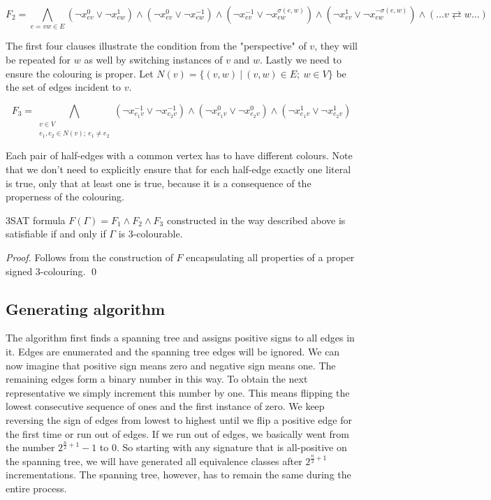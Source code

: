 $$F_2 = \bigwedge _{e = vw \in E} (\neg x^{0}_{ev} \vee \neg x^{1}_{ew}) \wedge (\neg x^{0}_{ev} \vee \neg x^{-1}_{ew}) \wedge (\neg x^{-1}_{ev} \lor \neg x^{\sigma (e, w)}_{ew}) \land (\neg x^{1}_{ev} \lor \neg x^{-\sigma (e, w)}_{ew}) \wedge (\dots v \rightleftarrows w \dots) $$

The first four clauses illustrate the condition from the "perspective" of $v$, they will be repeated for $w$ as well by switching instances of $v$ and $w$. Lastly we need to ensure the colouring is proper. Let $N(v) = \{(v, w) ~|~ (v,w) \in E; ~ w \in V \}$ be the set of edges incident to $v$.

$$F_3 = \bigwedge _{\substack{v \in V \\ e_1, e_2 \in N(v); ~ e_1 \neq e_2}} (\neg x^{-1}_{e_1v} \lor \neg x^{-1}_{e_2v}) \land (\neg x^{0}_{e_1v} \lor \neg x^{0}_{e_2v}) \land (\neg x^{1}_{e_1v} \lor \neg x^{1}_{e_2v}) $$

Each pair of half-edges with a common vertex has to have different colours. Note that we don't need to explicitly ensure that for each half-edge exactly one literal is true, only that at least one is true, because it is a consequence of the properness of the colouring.

\begin{theorem}
    3SAT formula $F(\Gamma) = F_1 \wedge F_2 \wedge F_3$ constructed in the way described above is satisfiable if and only if $\Gamma$ is 3-colourable.
\end{theorem}

\textit{Proof.} Follows from the construction of $F$ encapsulating all properties of a proper signed 3-colouring. \qed

\subsection{Generating algorithm}

The algorithm first finds a spanning tree and assigns positive signs to all edges in it. Edges are enumerated and the spanning tree edges will be ignored. We can now imagine that positive sign means zero and negative sign means one. The remaining edges form a binary number in this way. To obtain the next representative we simply increment this number by one. This means flipping the lowest consecutive sequence of ones and the first instance of zero. We keep reversing the sign of edges from lowest to highest until we flip a positive edge for the first time or run out of edges. If we run out of edges, we basically went from the number $2^{\frac{n}{2}+1} - 1$ to $0$. So starting with any signature that is all-positive on the spanning tree, we will have generated all equivalence classes after $2^{\frac{n}{2}+1}$ incrementations. The spanning tree, however, has to remain the same during the entire process.

